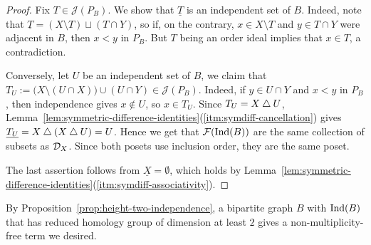 \documentclass[a4paper,leqno]{amsart}
\begin{document}
\begin{proof}
Fix $T\in \mathcal{J}(P_B)$.  We show that $\underline{T}$ is an independent set of $B$.  Indeed, note that $\underline{T}=(X\setminus T)\sqcup(T\cap Y)$, so if, on the contrary, $x\in X\setminus T$ and $y\in T\cap Y$ were adjacent in $B$, then $x<y$ in $P_B$.  But $T$ being an order ideal implies that $x\in T$, a contradiction.

Conversely, let $U$ be an independent set of $B$, we claim that $T_U:=\bigl(X\setminus(U\cap X)\bigr)\cup(U\cap Y)\in \mathcal{J}(P_B)$.  Indeed, if $y\in U\cap Y$ and $x<y$ in $P_B$, then independence gives $x\notin U$, so $x\in T_U$. Since $T_U=X\mathbin{\triangle} U$, Lemma~\ref{lem:symmetric-difference-identities}\textup{(\ref{itm:symdiff-cancellation})} gives
$\underline{T_U}=X\mathbin{\triangle}(X\mathbin{\triangle} U)=U$.
Hence we get that $\mathcal F(\operatorname{Ind}(B))$ are the same collection of subsets as $\mathcal D_X$.  Since both posets use inclusion order, they are the same poset.

The last assertion follows from $\underline{X}=\emptyset$, which holds by Lemma~\ref{lem:symmetric-difference-identities}\textup{(\ref{itm:symdiff-associativity})}.
\end{proof}

By Proposition~\ref{prop:height-two-independence}, a bipartite graph $B$ with $\operatorname{Ind}(B)$ that has reduced homology group of dimension at least $2$ gives a non-multiplicity-free term we desired.
\end{document}
